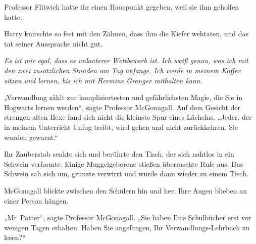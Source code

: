 Professor Flitwick hatte ihr einen Hauspunkt gegeben, weil sie ihm geholfen hatte.

Harry knirschte so fest mit den Zähnen, dass ihm die Kiefer wehtaten, und das tat seiner Aussprache nicht gut.

\emph{Es ist mir egal, dass es unlauterer Wettbewerb ist. Ich weiß genau, was ich mit den zwei zusätzlichen Stunden am Tag anfange. Ich werde in meinem Koffer sitzen und lernen, bis ich mit Hermine Granger mithalten kann.}

\later

„Verwandlung zählt zur kompliziertesten und gefährlichsten Magie, die Sie in Hogwarts lernen werden“, sagte Professor McGonagall. Auf dem Gesicht der strengen alten Hexe fand sich nicht die kleinste Spur eines Lächelns.
„Jeder, der in meinem Unterricht Unfug treibt, wird gehen und nicht zurückkehren. Sie wurden gewarnt.“

Ihr Zauberstab senkte sich und berührte den Tisch, der sich nahtlos in ein Schwein verformte. Einige Muggelgeborene stießen überraschte Rufe aus. Das Schwein sah sich um, grunzte verwirrt und wurde dann wieder zu einem Tisch.

McGonagall blickte zwischen den Schülern hin und her. Ihre Augen blieben an einer Person hängen.

„Mr~Potter“, sagte Professor McGonagall.
„Sie haben Ihre Schulbücher erst vor wenigen Tagen erhalten. Haben Sie angefangen, Ihr Verwandlungs-Lehrbuch zu lesen?“

